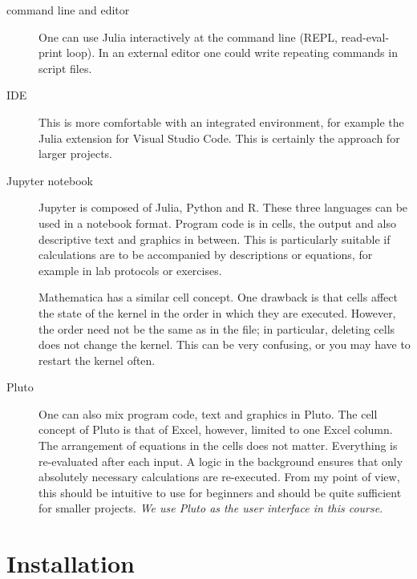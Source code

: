 \begin{description}
\item[command line and editor] One can use Julia interactively at the command line (REPL, read-eval-print loop). In an external editor one could write repeating commands in script files.

\item[IDE] This is more comfortable with an integrated environment, for example the Julia extension 
for Visual Studio Code. This is certainly the approach for larger projects.

\item[Jupyter notebook] Jupyter is composed of Julia, Python and R. These three languages can be used in a notebook format. Program code is in cells, the output and also descriptive text and graphics in between. This is particularly suitable if calculations are to be accompanied by descriptions or equations, for example in lab protocols or exercises. 


Mathematica has a similar cell concept. One drawback is that cells affect the state of the kernel in the order in which they are executed. However, the order need not be the same as in the file; in particular, deleting cells does not change the kernel. This can be very confusing, or you may have to restart the kernel often.

\item[Pluto] One can also mix program code, text and graphics in Pluto. The cell concept of Pluto is that of Excel, however, limited to one Excel column. The arrangement of equations in the cells does not matter. Everything is re-evaluated after each input. A logic in the background ensures that only absolutely necessary calculations are re-executed. From my point of view, this should be intuitive to use for beginners and should be quite sufficient for smaller projects. \emph{We use Pluto as the user interface in this course}.

\end{description}



\section{Installation}


